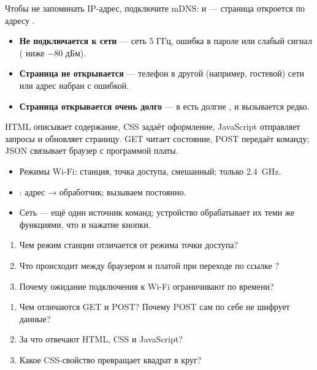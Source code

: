 
\begin{tip}
Чтобы не запоминать IP-адрес, подключите mDNS:  и
 --- страница откроется по адресу .
\end{tip}

\begin{trouble}
\begin{itemize}[leftmargin=*]
  \item \textbf{Не подключается к сети} --- сеть 5 ГГц, ошибка в пароле или слабый сигнал ( ниже $-80$ дБм).
  \item \textbf{Страница не открывается} --- телефон в другой (например, гостевой) сети или адрес набран с ошибкой.
  \item \textbf{Страница открывается очень долго} --- в  есть долгие , и  вызывается редко.
\end{itemize}
\end{trouble}

\begin{summary}
HTML описывает содержание, CSS задаёт оформление, JavaScript отправляет запросы и обновляет страницу.
GET читает состояние, POST передаёт команду; JSON связывает браузер с программой платы.

\begin{itemize}[leftmargin=*]
  \item Режимы Wi-Fi: станция, точка доступа, смешанный; только \SI{2.4}{GHz}.
  \item {}: адрес → обработчик;  вызываем постоянно.
  \item Сеть --- ещё один источник команд; устройство обрабатывает их теми же функциями, что и нажатие кнопки.
\end{itemize}
\end{summary}

\begin{selfcheck}
\begin{enumerate}
  \item Чем режим станции отличается от режима точки доступа?
  \item Что происходит между браузером и платой при переходе по ссылке ?
  \item Почему ожидание подключения к Wi-Fi ограничивают по времени?
\end{enumerate}
  \begin{enumerate}[resume]
  \item Чем отличаются GET и POST? Почему POST сам по себе не шифрует данные?
  \item За что отвечают HTML, CSS и JavaScript?
  \item Какое CSS-свойство превращает квадрат в круг?
  \end{enumerate}
\end{selfcheck}

